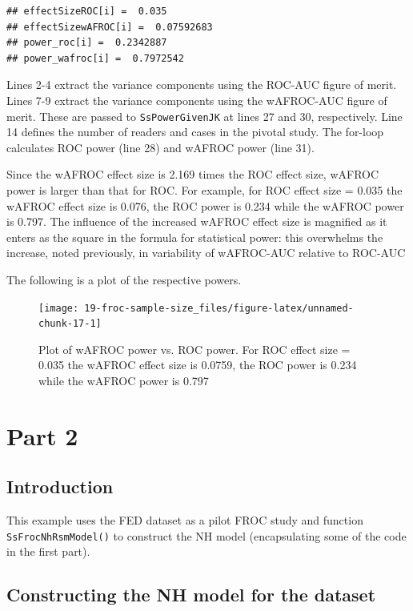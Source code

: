 \documentclass[
]{book}
\begin{document}
\begin{verbatim}
## effectSizeROC[i] =  0.035 
## effectSizewAFROC[i] =  0.07592683 
## power_roc[i] =  0.2342887 
## power_wafroc[i] =  0.7972542
\end{verbatim}

Lines 2-4 extract the variance components using the ROC-AUC figure of merit. Lines 7-9 extract the variance components using the wAFROC-AUC figure of merit. These are passed to \texttt{SsPowerGivenJK} at lines 27 and 30, respectively. Line 14 defines the number of readers and cases in the pivotal study. The for-loop calculates ROC power (line 28) and wAFROC power (line 31).

Since the wAFROC effect size is 2.169 times the ROC effect size, wAFROC power is larger than that for ROC. For example, for ROC effect size = 0.035 the wAFROC effect size is 0.076, the ROC power is 0.234 while the wAFROC power is 0.797. The influence of the increased wAFROC effect size is magnified as it enters as the square in the formula for statistical power: this overwhelms the increase, noted previously, in variability of wAFROC-AUC relative to ROC-AUC

The following is a plot of the respective powers.

\begin{figure}

{\centering \texttt{[image: 19-froc-sample-size\_files/figure-latex/unnamed-chunk-17-1]} 

}

\caption{Plot of wAFROC power vs. ROC power. For ROC effect size = 0.035 the wAFROC effect size is 0.0759, the ROC power is 0.234 while the wAFROC power is 0.797}\label{fig:unnamed-chunk-17}
\end{figure}

\hypertarget{part-2}{%
\section{Part 2}\label{part-2}}

\hypertarget{introduction}{%
\subsection{Introduction}\label{introduction}}

This example uses the FED dataset as a pilot FROC study and function \texttt{SsFrocNhRsmModel()} to construct the NH model (encapsulating some of the code in the first part).

\hypertarget{constructing-the-nh-model-for-the-dataset}{%
\subsection{Constructing the NH model for the dataset}\label{constructing-the-nh-model-for-the-dataset}}
\end{document}
